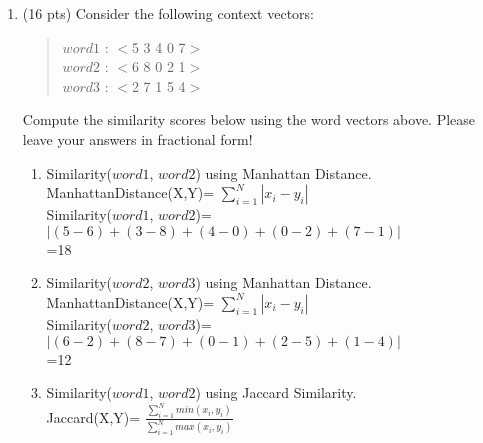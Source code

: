 \documentclass[11pt]{article}
\begin{document}
\begin{enumerate}
\begin{enumerate}
\end{enumerate}



\item (16 pts) Consider the following context vectors:

\begin{quote}
\hspace*{.5in} $word1$ : $<$5 3 4 0 7$>$ \\
\hspace*{.5in} $word2$ : $<$6 8 0 2 1$>$  \\
\hspace*{.5in} $word3$ : $<$2 7 1 5 4$>$ 
\end{quote}

Compute the similarity scores below using the word
vectors above. Please leave your answers in fractional form!

\begin{enumerate}
\item Similarity($word1$, $word2$) using Manhattan Distance.  \\ 

ManhattanDistance(X,Y)= $\sum\limits_{i=1}^{N} |x_i -y_i|$\\

Similarity($word1$, $word2$)= $| (5-6)+(3-8)+(4-0)+(0-2)+(7-1) |$\\

					    =18\\	

\item Similarity($word2$, $word3$) using Manhattan Distance.  \\ 

ManhattanDistance(X,Y)= $\sum\limits_{i=1}^{N} |x_i -y_i|$\\

Similarity($word2$, $word3$)= $| (6-2)+(8-7)+(0-1)+(2-5)+(1-4) |$\\

					    =12\\	

\item Similarity($word1$, $word2$) using Jaccard Similarity.  \\ 

Jaccard(X,Y)= $\frac{\sum\limits_{i=1}^{N} min(x_i,y_i)}{\sum\limits_{i=1}^{N} max(x_i,y_i)}$\\


\end{enumerate}
\end{enumerate}
\end{document}

